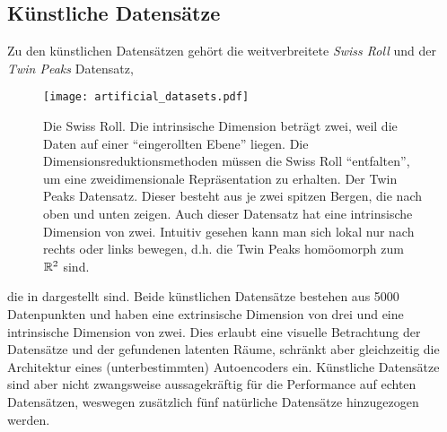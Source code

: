 \subsection{Künstliche Datensätze}
\label{ch:Vergleich:sec:VerwendeteDatensaetze:kuenstlich}
Zu den künstlichen Datensätzen gehört die weitverbreitete \textit{Swiss Roll} und der \textit{Twin Peaks} Datensatz,
\begin{figure}[ht]
	\begin{center}
		\texttt{[image: artificial\_datasets.pdf]}
	\end{center}
	\caption[Künstliche Datensätze]{\figleft Die Swiss Roll. Die intrinsische Dimension beträgt zwei, weil die Daten auf einer \enquote{eingerollten Ebene} liegen. Die Dimensionsreduktionsmethoden müssen die Swiss Roll \enquote{entfalten}, um eine zweidimensionale Repräsentation zu erhalten. \figright Der Twin Peaks Datensatz. Dieser besteht aus je zwei spitzen Bergen, die nach oben und unten zeigen. Auch dieser Datensatz hat eine intrinsische Dimension von zwei. Intuitiv gesehen kann man sich lokal nur nach rechts oder links bewegen, d.h. die Twin Peaks homöomorph zum $\mathbb{R}^2$ sind.}
	\label{fig:ArtificialDatasets}
\end{figure}
die in  dargestellt sind.
Beide künstlichen Datensätze bestehen aus 5000 Datenpunkten und haben eine extrinsische Dimension von drei und eine intrinsische
Dimension von zwei. Dies erlaubt eine visuelle Betrachtung der Datensätze und der gefundenen
latenten Räume, schränkt aber gleichzeitig die Architektur eines (unterbestimmten) Autoencoders
ein. Künstliche Datensätze sind aber nicht zwangsweise aussagekräftig für die Performance auf echten Datensätzen, weswegen zusätzlich fünf natürliche Datensätze hinzugezogen werden.

